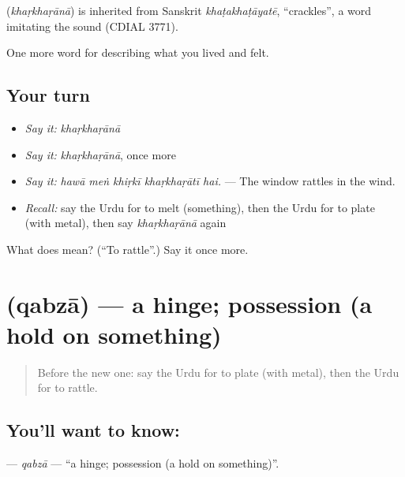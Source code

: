 \begin{cousinweb}
\textbf{} (\emph{khaṛkhaṛānā}) is inherited from Sanskrit \emph{khaṭakhaṭāyatē}, \textquotedblleft{}crackles\textquotedblright{}, a word imitating the sound (CDIAL 3771).
\end{cousinweb}

\begin{grammarlens}[title={What you've built}]
One more word for describing what you lived and felt.
\end{grammarlens}

\subsection*{Your turn}
\begin{itemize}
\raggedright
  \item \emph{Say it:} \emph{khaṛkhaṛānā}
  \item \emph{Say it:} \emph{khaṛkhaṛānā}, once more
  \item \emph{Say it:} \emph{hawā meṅ khiṛkī khaṛkhaṛātī hai.} — The window rattles in the wind.
  \item \emph{Recall:} say the Urdu for to melt (something), then the Urdu for to plate (with metal), then say \emph{khaṛkhaṛānā} again
\end{itemize}

\begin{tcolorbox}[breakable,colback=teal!4,colframe=teal!35!black,title={Before you move on}]
What does  mean? (\textquotedblleft{}To rattle\textquotedblright{}.) Say it once more.
\end{tcolorbox}
\section[\texorpdfstring{\ur{قبضہ} (qabzā)}{قبضہ (qabzā)}]{ (qabzā) — a hinge; possession (a hold on something)}

\label{lesson:UR-C502-qabza}



\begin{quote}
Before the new one: say the Urdu for to plate (with metal), then the Urdu for to rattle.
\end{quote}

\subsection*{You'll want to know: }
\textbf{} — \emph{qabzā} — \textquotedblleft{}a hinge; possession (a hold on something)\textquotedblright{}.

